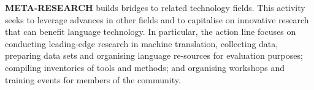 \begin{multicols}{2}
\textbf{META-RESEARCH} builds bridges to related technology fields. This activity seeks to leverage advances in other fields and to capitalise on innovative research that can benefit language technology. In particular, the action line focuses on conducting leading-edge research in machine translation, collecting data, preparing data sets and organising language re-sources for evaluation purposes; compiling inventories of tools and methods; and organising workshops and training events for members of the community.

\end{multicols}

\cleardoublepage

\appendix
{}



  
\cleardoublepage

\label{metanetmembers}

